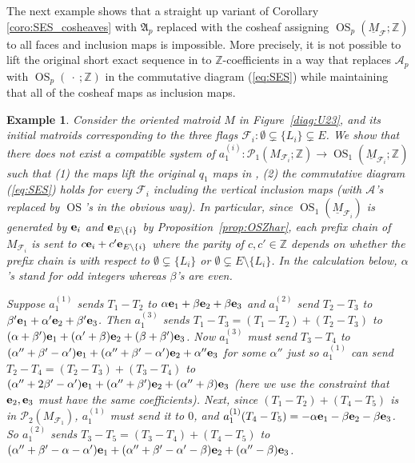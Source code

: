 \documentclass{amsart}
\newtheorem{example}[theorem]{Example}
\newcommand\Acal{{\mathcal A}}
\newcommand\Fcal{{\mathcal F}}
\newcommand\Pcal{{\mathcal P}}
\newcommand\ee{{\bf e}}
\newcommand\ZZ{{\mathbb Z}}
\newcommand\qbv{{q}}
\newcommand\abv{{a}}
\DeclareMathOperator{\OS}{OS}
\begin{document}
{The next example shows that a straight up variant of Corollary \ref{coro:SES_cosheaves} with $\mathfrak{A}_p$ replaced with the cosheaf assigning $\OS_p(\underline{M}_{\Fcal}; \ZZ)$ to all faces and inclusion maps is impossible. More precisely, it is not possible to lift the original short exact sequence in \cite{RS} to $\ZZ$-coefficients in a way that replaces $\Acal_p$ with $\OS_p(\  \cdot \ ; \ZZ)$ in the commutative diagram (\ref{eq:SES})
while maintaining that all of the cosheaf maps as inclusion maps.

\begin{example}
\rm
Consider the oriented matroid $M$ in Figure~\ref{diag:U23}, and its initial matroids corresponding to the three flags $\Fcal_i:\emptyset \subsetneq \{L_i\} \subsetneq  E$. We show that there does not exist a compatible system of $\abv_1^{(i)}:\Pcal_1(M_{\Fcal_i};\ZZ)\rightarrow\OS_1(\underline{M}_{\Fcal_i};\ZZ)$ such that (1) the maps lift the original $\qbv_1$ maps in \cite{RS}, (2) the commutative diagram (\ref{eq:SES}) holds for every $\Fcal_i$ including the vertical inclusion maps (with $\Acal$'s replaced by $\OS$'s in the obvious way). In particular, since $\OS_1(\underline{M}_{\Fcal_i})$ is generated by $\ee_i$ and $\ee_{E\setminus\{i\}}$ by Proposition~\ref{prop:OSZhar}, each prefix chain of $M_{\Fcal_i}$ is sent to $c\ee_i+c'\ee_{E\setminus\{i\}}$ where the parity of $c,c'\in\ZZ$ depends on whether the prefix chain is with respect to $\emptyset\subsetneq \{L_i\}$ or $\emptyset \subsetneq E\setminus\{L_i\}$. In the calculation below, $\alpha$'s stand for odd integers whereas $\beta$'s are even.

Suppose $\abv_1^{(1)}$ sends $T_1-T_2$ to $\alpha\ee_1+\beta\ee_2+\beta\ee_3$ and $\abv_1^{(2)}$ send $T_2-T_3$ to $\beta'\ee_1+\alpha'\ee_2+\beta'\ee_3$. Then $\abv_1^{(3)}$ sends $T_1-T_3=(T_1-T_2)+(T_2-T_3)$ to $(\alpha+\beta')\ee_1+(\alpha'+\beta)\ee_2+(\beta+\beta')\ee_3$. Now $\abv_1^{(3)}$ must send $T_3-T_4$ to $(\alpha''+\beta'-\alpha')\ee_1+(\alpha''+\beta'-\alpha')\ee_2+\alpha''\ee_3$ for some $\alpha''$ just so $\abv_1^{(1)}$ can send $T_2-T_4=(T_2-T_3)+(T_3-T_4)$ to $(\alpha''+2\beta'-\alpha')\ee_1+(\alpha''+\beta')\ee_2+(\alpha''+\beta)\ee_3$ (here we use the constraint that $\ee_2,\ee_3$ must have the same coefficients). Next, since $(T_1-T_2)+(T_4-T_5)$ is in $\Pcal_2(M_{\Fcal_1})$, $\abv_1^{(1)}$ must send it to $0$, and $\abv_1^{(1)}(T_4-T_5)=-\alpha\ee_1-\beta\ee_2-\beta\ee_3$. So $\abv_1^{(2)}$ sends $T_3-T_5=(T_3-T_4)+(T_4-T_5)$ to $(\alpha''+\beta'-\alpha-\alpha')\ee_1+(\alpha''+\beta'-\alpha'-\beta)\ee_2+(\alpha''-\beta)\ee_3$.


\end{example}}
\end{document}
